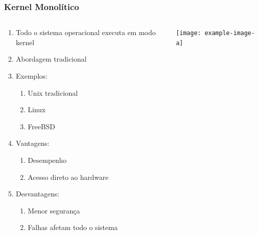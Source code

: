 \documentclass{beamer}
\begin{document}
\begin{frame}[fragile]
\frametitle{Kernel Monolítico}

\begin{columns}
    \begin{column}{0.55\textwidth}
        \begin{enumerate}\small
            \item Todo o sistema operacional executa em modo kernel
            \item Abordagem tradicional
            \item Exemplos:
            \begin{enumerate}\footnotesize
                \item Unix tradicional
                \item Linux
                \item FreeBSD
            \end{enumerate}
            \item Vantagens:
            \begin{enumerate}\footnotesize
                \item Desempenho
                \item Acesso direto ao hardware
            \end{enumerate}
            \item Desvantagens:
            \begin{enumerate}\footnotesize
                \item Menor segurança
                \item Falhas afetam todo o sistema
            \end{enumerate}
        \end{enumerate}
    \end{column}
    
    \begin{column}{0.45\textwidth}
        \begin{center}
            \texttt{[image: example-image-a]}
        \end{center}
    \end{column}
\end{columns}
\end{frame}
\end{document}
